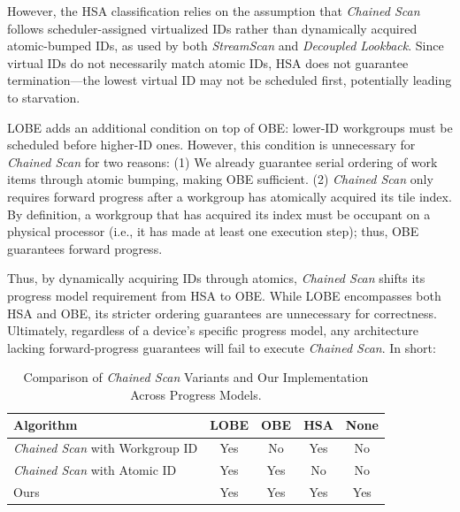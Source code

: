 \documentclass[acmsmall, manuscript, screen, review, anonymous]{acmart}
\begin{document}
However, the HSA classification relies on the assumption that \emph{Chained Scan} follows scheduler-assigned virtualized IDs rather than dynamically acquired atomic-bumped IDs, as used by both \emph{StreamScan} and \emph{Decoupled Lookback}. Since virtual IDs do not necessarily match atomic IDs, HSA does not guarantee termination---the lowest virtual ID may not be scheduled first, potentially leading to starvation.

LOBE adds an additional condition on top of OBE\@: lower-ID workgroups must be scheduled before higher-ID ones. However, this condition is unnecessary for \emph{Chained Scan} for two reasons: (1) We already guarantee serial ordering of work items through atomic bumping, making OBE sufficient. (2) \emph{Chained Scan} only requires forward progress after a workgroup has atomically acquired its tile index. By definition, a workgroup that has acquired its index must be occupant on a physical processor (i.e., it has made at least one execution step); thus, OBE guarantees forward progress.

Thus, by dynamically acquiring IDs through atomics, \emph{Chained Scan} shifts its progress model requirement from HSA to OBE. While LOBE encompasses both HSA and OBE, its stricter ordering guarantees are unnecessary for correctness. Ultimately, regardless of a device’s specific progress model, any architecture lacking forward-progress guarantees will fail to execute \emph{Chained Scan}. In short:

\begin{table}[h!]
  \small
  \centering
  \begin{tabular}{lcccc}
    \toprule
    Algorithm                             & LOBE & OBE & HSA & None \\
    \midrule
    \emph{Chained Scan} with Workgroup ID & Yes  & No  & Yes & No   \\
    \emph{Chained Scan} with Atomic ID    & Yes  & Yes & No  & No   \\
    Ours                                  & Yes  & Yes & Yes & Yes  \\
    \bottomrule
  \end{tabular}
  \caption{Comparison of \emph{Chained Scan} Variants and Our Implementation Across Progress Models.\label{tab:progress_models}}
\end{table}
\end{document}
